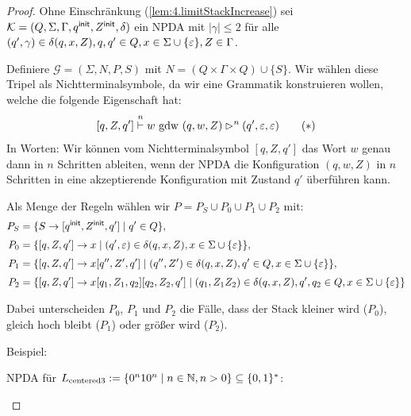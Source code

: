 \begin{proof}
 Ohne Einschränkung (\autoref{lem:4.limitStackIncrease}) sei $\mathcal{K} = (Q, \Sigma, \Gamma, q^\mathsf{init}, Z^\mathsf{init}, \delta)$ ein \ac{NPDA} mit $|\gamma| \le 2$ für alle $(q', \gamma) \in \delta(q, x, Z), q, q' \in Q, x \in \Sigma \cup \{\varepsilon\}, Z \in \Gamma$.

    Definiere $\mathcal{G} = (\Sigma, N, P, S)$ mit $N = (Q \times \Gamma \times Q) \cup \{S\}$.
    Wir wählen diese Tripel als Nichtterminalsymbole, da wir eine Grammatik konstruieren wollen, welche die folgende Eigenschaft hat:
      \begin{equation*}\label{eq:npdaToCfgProp}
        [q,Z,q']\stackrel{n}{\vdash} w \text{ gdw } (q,w,Z) \rhd^n (q',\varepsilon,\varepsilon) \tag{$*$}
      \end{equation*}
    In Worten: Wir können vom Nichtterminalsymbol $[q,Z,q']$ das Wort $w$ genau dann in $n$ Schritten ableiten,
    wenn der \ac{NPDA} die Konfiguration $(q,w,Z)$ in $n$ Schritten in eine akzeptierende Konfiguration mit Zustand $q'$ überführen kann.
    
    Als Menge der Regeln wählen wir $P=P_S\cup P_0\cup P_1\cup P_2$ mit:
    \begin{align*}
    P_S &= \{S \to [q^\mathsf{init}, Z^\mathsf{init}, q']\mid q'\in Q\}, \\[1mm]
    P_0 &= \{ [q, Z, q'] \to x \mid (q', \varepsilon)\in \delta(q, x, Z), x \in \Sigma \cup \{\varepsilon\} \}, \\[1mm]
    P_1 &= \{[q, Z, q'] \to x[q'', Z', q'] \mid (q'', Z')\in \delta(q, x, Z), q' \in Q, x \in \Sigma \cup \{\varepsilon\}\}, \\[1mm]
    P_2 &= \{[q, Z, q'] \to x[q_1,Z_1,q_2][q_2, Z_2, q'] \mid (q_1, Z_1Z_2)\in\delta(q, x, Z), q', q_2 \in Q, x \in \Sigma \cup \{\varepsilon\} \}
    \end{align*}
    
    Dabei unterscheiden $P_0$, $P_1$ und $P_2$ die Fälle, dass der Stack kleiner wird ($P_0$), gleich hoch bleibt ($P_1$) oder größer wird ($P_2$).
    
    Beispiel:
    
    \ac{NPDA} für $L_\text{centered3}:=\{0^n10^n \mid n\in\mathbb{N}, n > 0 \}\subseteq\{0,1\}^*$:
    
    \begin{center}
\end{center}
\end{proof}
